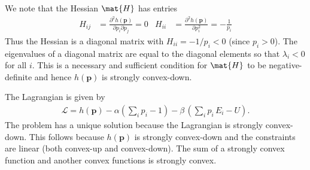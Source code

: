 \documentclass{sotonExamBoxes}    %
\newcommand{\bra}[1]{\left(#1\right)}
\begin{document}
\begin{question}{10}
  \begin{qparts}
    \begin{answer}
      We note that the Hessian $\mat{H}$ has entries
      \begin{align*}
        H_{ij}
        &= \frac{\partial^2 h(\bm{p})}{\partial p_i \partial p_j} = 0
        & H_{ii} &= \frac{\partial^2 h(\bm{p})}{\partial p_i^2} 
                 = - \frac{1}{p_i}
      \end{align*}
      Thus the Hessian is a diagonal matrix with $H_{ii} = -1/p_i <0$
      (since $p_i>0$).  The eigenvalues of a diagonal matrix are equal
      to the diagonal elements so that $\lambda_i<0$ for all $i$.
      This is a necessary and sufficient condition for $\mat{H}$ to be
      negative-definite and hence $h(\bm{p})$ is strongly convex-down.
    \end{answer}
    \vspace{1cm}

    \begin{answer}
      The Lagrangian is given by
      \begin{align*}
        \mathcal{L} = h(\bm{p}) - \alpha \bra{\sum_i p_i  -1}
        - \beta \, \bra{\sum_i p_i  \, E_i - U}.
      \end{align*}
      The problem has a unique solution because the Lagrangian is
      strongly convex-down.  This follows because $h(\bm{p})$ is
      strongly convex-down and the constraints are linear (both
      convex-up and convex-down).  The sum of a strongly convex
      function and another convex functions is strongly convex.
    \end{answer}
    \freshpage
    

\end{qparts}
\end{question}
\end{document}
